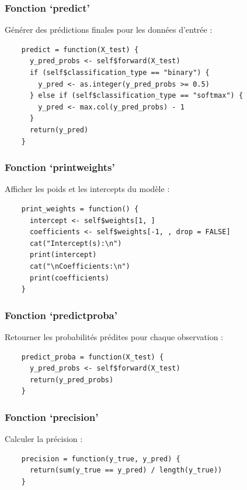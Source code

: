 \documentclass[10pt,french]{report}
\begin{document}
    \subsubsection{Fonction \enquote*{predict}}

    Générer des prédictions finales pour les données d’entrée :
    \begin{verbatim}
    predict = function(X_test) {
      y_pred_probs <- self$forward(X_test)
      if (self$classification_type == "binary") {
        y_pred <- as.integer(y_pred_probs >= 0.5)
      } else if (self$classification_type == "softmax") {
        y_pred <- max.col(y_pred_probs) - 1
      }
      return(y_pred)
    }
    \end{verbatim}

    \subsubsection{Fonction \enquote*{print\textunderscore weights}}

    Afficher les poids et les intercepts du modèle :
    \begin{verbatim}
    print_weights = function() {
      intercept <- self$weights[1, ]
      coefficients <- self$weights[-1, , drop = FALSE]
      cat("Intercept(s):\n")
      print(intercept)
      cat("\nCoefficients:\n")
      print(coefficients)
    }
    \end{verbatim}

    \subsubsection{Fonction \enquote*{predict\textunderscore proba}}

    Retourner les probabilités prédites pour chaque observation :
    \begin{verbatim}
    predict_proba = function(X_test) {
      y_pred_probs <- self$forward(X_test)
      return(y_pred_probs)
    }
    \end{verbatim}

    \subsubsection{Fonction \enquote*{precision}}

    Calculer la précision :
    \begin{verbatim}
    precision = function(y_true, y_pred) {
      return(sum(y_true == y_pred) / length(y_true))
    }
    \end{verbatim}
\end{document}
